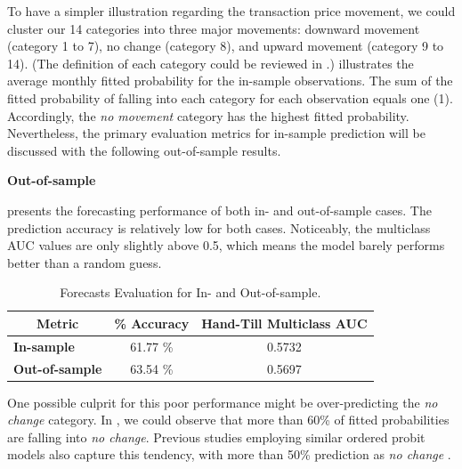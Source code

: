 To have a simpler illustration regarding the transaction price movement, we could cluster our 14 categories into three major movements: downward movement (category 1 to 7), no change (category 8), and upward movement (category 9 to 14). (The definition of each category could be reviewed in .)  illustrates the average monthly fitted probability for the in-sample observations. The sum of the fitted probability of falling into each category for each observation equals one (1). Accordingly, the \textit{no movement} category has the highest fitted probability. Nevertheless, the primary evaluation metrics for in-sample prediction will be discussed with the following out-of-sample results.




{\noindent\bfseries Out-of-sample }

 presents the forecasting performance of both in- and out-of-sample cases. The prediction accuracy is relatively low for both cases. Noticeably, the multiclass AUC values are only slightly above 0.5, which means the model barely performs better than a random guess. 



\begin{table}[H]
\centering
\begin{tabular}{@{}lcc@{}}
\toprule
\multicolumn{1}{c}{Metric} & \multicolumn{1}{l}{\textbf{\% Accuracy}} & \multicolumn{1}{l}{\textbf{Hand-Till Multiclass AUC}} \\ \midrule
\textbf{In-sample}         & 61.77 \%                                 & 0.5732                                                \\
\textbf{Out-of-sample}     & 63.54 \%                                 & 0.5697                                                \\ \bottomrule
\end{tabular}
\caption{Forecasts Evaluation for In- and Out-of-sample.}
\label{tab:table-11}
\end{table}


One possible culprit for this poor performance might be over-predicting the \textit{no change} category. In , we could observe that more than 60\% of fitted probabilities are falling into \textit{no change}. Previous studies employing similar ordered probit models also capture this tendency, with more than 50\% prediction as \textit{no change} \citep{yangparwada2012, kim2014}. 


